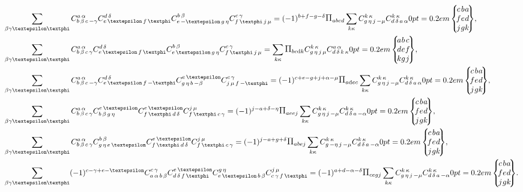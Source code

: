 \begin{align}
& \sum_{\beta \gamma \varepsilon \varphi} \clebsch{b}{\beta}{c}{-\gamma}{a}{\alpha} \clebsch{e}{\varepsilon}{f}{\varphi}{d}{\delta} \clebsch{e}{-\varepsilon}{g}{\eta}{b}{\beta} \clebsch{f}{\varphi}{j}{\mu}{c}{\gamma}=(-1)^{b+f-g-\delta} \Fact{a b c d} \sum_{k \kappa} \clebsch{g}{\eta}{j}{-\mu}{k}{\kappa} \clebsch{d}{\delta}{a}{\alpha}{k}{\kappa}\ninej{c}{b}{a}{f}{e}{d}{j}{g}{k}, \label{eq:8:7:25}\\
& \sum_{\beta \gamma \varepsilon \varphi} \clebsch{b}{\beta}{c}{\gamma}{a}{\alpha} \clebsch{e}{\varepsilon}{f}{\varphi}{d}{\delta} \clebsch{e}{\varepsilon}{g}{\eta}{b}{\beta} \clebsch{f}{\varphi}{j}{\mu}{c}{\gamma}=\sum_{k \kappa} \Fact{b c\dd k} \clebsch{g}{\eta}{j}{\mu}{k}{\kappa} \clebsch{d}{ \delta}{k}{\kappa}{a}{\alpha}\ninej{a}{b}{c}{d}{e}{f}{k}{g}{j}, \label{eq:8:7:26}\\
& \sum_{\beta \gamma \varepsilon \varphi} \clebsch{b}{\beta}{c}{-\gamma}{a}{\alpha} \clebsch{e}{\varepsilon}{f}{-\varphi}{d}{\delta} \clebsch{g}{\eta}{b}{-\beta}{e}{\varepsilon} \clebsch{j}{\mu}{f}{-\varphi}{c}{\gamma}=(-1)^{c+e-g+j+\alpha-\mu} \Fact{a\dd e c} \sum_{k \kappa} \clebsch{g}{\eta}{j}{-\mu}{k}{\kappa} \clebsch{d}{\delta}{a}{\alpha}{k}{\kappa}\ninej{c}{b}{a}{f}{e}{d}{j}{g}{k}, \label{eq:8:7:27}\\
& \sum_{\beta \gamma \varepsilon \varphi} \clebsch{b}{\beta}{c}{\gamma}{a}{\alpha} \clebsch{b}{\beta}{g}{\eta}{e}{\varepsilon} \clebsch{f}{\varphi}{d}{\delta}{e}{\varepsilon} \clebsch{f}{\varphi}{c}{\gamma}{j}{\mu}=(-1)^{j-a+\delta-\eta} \Fact{a e e j} \sum_{k \kappa} \clebsch{g}{\eta}{j}{-\mu}{k}{\kappa} \clebsch{d}{\delta}{a}{-\alpha}{k}{\kappa}\ninej{c}{b}{a}{f}{e}{d}{j}{g}{k}, \label{eq:8:7:28}\\
& \sum_{\beta \gamma \varepsilon \varphi} \clebsch{b}{\beta}{c}{\gamma}{a}{\alpha} \clebsch{g}{\eta}{e}{\varepsilon}{b}{\beta} \clebsch{f}{\varphi}{d}{\delta}{e}{\varepsilon} \clebsch{f}{\varphi}{c}{\gamma}{j}{\mu}=(-1)^{j-a+g+\delta} \Fact{a b e j} \sum_{k \kappa} \clebsch{g}{-\eta}{j}{-\mu}{k}{\kappa} \clebsch{d}{\delta}{a}{-\alpha}{k}{\kappa}\ninej{c}{b}{a}{f}{e}{d}{j}{g}{k}, \label{eq:8:7:29}\\
& \sum_{\beta \gamma \varepsilon\varphi}(-1)^{c-\gamma+e-\varepsilon} \clebsch{a}{\alpha}{b}{\beta}{c}{\gamma} \clebsch{d}{\delta}{f}{\varphi}{e}{\varepsilon} \clebsch{e}{\varepsilon}{b}{\beta}{g}{\eta} \clebsch{c}{\gamma}{f}{\varphi}{j}{\mu}=(-1)^{a+d-\alpha-\delta} \Fact{c e g j} \sum_{k \kappa} \clebsch{g}{\eta}{j}{-\mu}{k}{\kappa} \clebsch{d}{\delta}{a}{-\alpha}{k}{\kappa}\ninej{c}{b}{a}{f}{e}{d}{j}{g}{k} . \label{eq:8:7:30}
\end{align}
